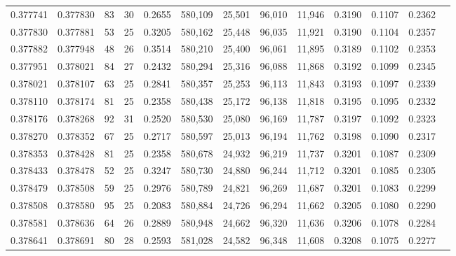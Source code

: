 \begin{tabular}{rrrrrrrrrrrrr}
0.377741 & 0.377830 &    83 &  30 &                                     0.2655 & 580,109 &  25,501 &  96,010 &  11,946 & 0.3190 & 0.1107 & 0.2362 \\
0.377830 & 0.377881 &    53 &  25 &                                     0.3205 & 580,162 &  25,448 &  96,035 &  11,921 & 0.3190 & 0.1104 & 0.2357 \\
0.377882 & 0.377948 &    48 &  26 &                                     0.3514 & 580,210 &  25,400 &  96,061 &  11,895 & 0.3189 & 0.1102 & 0.2353 \\
0.377951 & 0.378021 &    84 &  27 &                                     0.2432 & 580,294 &  25,316 &  96,088 &  11,868 & 0.3192 & 0.1099 & 0.2345 \\
0.378021 & 0.378107 &    63 &  25 &                                     0.2841 & 580,357 &  25,253 &  96,113 &  11,843 & 0.3193 & 0.1097 & 0.2339 \\
0.378110 & 0.378174 &    81 &  25 &                                     0.2358 & 580,438 &  25,172 &  96,138 &  11,818 & 0.3195 & 0.1095 & 0.2332 \\
0.378176 & 0.378268 &    92 &  31 &                                     0.2520 & 580,530 &  25,080 &  96,169 &  11,787 & 0.3197 & 0.1092 & 0.2323 \\
0.378270 & 0.378352 &    67 &  25 &                                     0.2717 & 580,597 &  25,013 &  96,194 &  11,762 & 0.3198 & 0.1090 & 0.2317 \\
0.378353 & 0.378428 &    81 &  25 &                                     0.2358 & 580,678 &  24,932 &  96,219 &  11,737 & 0.3201 & 0.1087 & 0.2309 \\
0.378433 & 0.378478 &    52 &  25 &                                     0.3247 & 580,730 &  24,880 &  96,244 &  11,712 & 0.3201 & 0.1085 & 0.2305 \\
0.378479 & 0.378508 &    59 &  25 &                                     0.2976 & 580,789 &  24,821 &  96,269 &  11,687 & 0.3201 & 0.1083 & 0.2299 \\
0.378508 & 0.378580 &    95 &  25 &                                     0.2083 & 580,884 &  24,726 &  96,294 &  11,662 & 0.3205 & 0.1080 & 0.2290 \\
0.378581 & 0.378636 &    64 &  26 &                                     0.2889 & 580,948 &  24,662 &  96,320 &  11,636 & 0.3206 & 0.1078 & 0.2284 \\
0.378641 & 0.378691 &    80 &  28 &                                     0.2593 & 581,028 &  24,582 &  96,348 &  11,608 & 0.3208 & 0.1075 & 0.2277 \\

\end{tabular}
